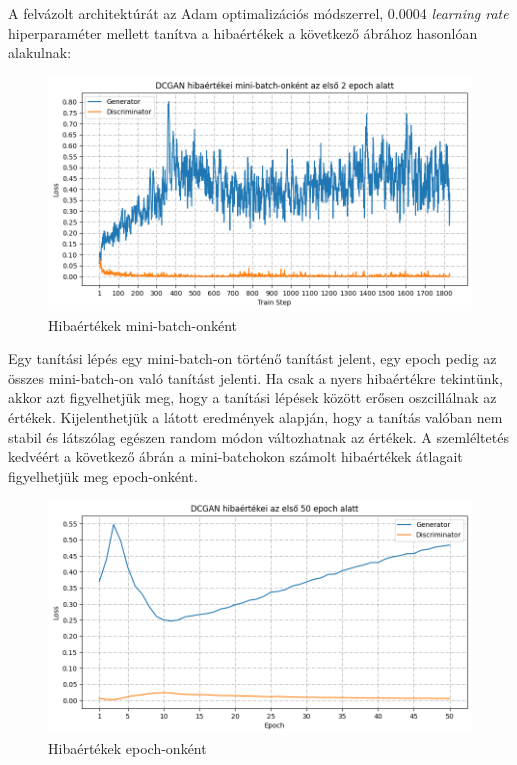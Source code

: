 
A felvázolt architektúrát az Adam optimalizációs módszerrel, 0.0004 \textit{learning rate} hiperparaméter mellett tanítva a hibaértékek a következő ábrához hasonlóan alakulnak:

\begin{figure}[h]
\centering
\includegraphics[width=15cm]{images/miniloss.png}
\caption{Hibaértékek mini-batch-onként}
\label{fig:mini-batch_loss_plot}
\end{figure}

Egy tanítási lépés egy mini-batch-on történő tanítást jelent, egy epoch pedig az összes mini-batch-on való tanítást jelenti.
Ha csak a nyers hibaértékre tekintünk, akkor azt figyelhetjük meg, hogy a tanítási lépések között erősen oszcillálnak az értékek. Kijelenthetjük a látott eredmények alapján, hogy a tanítás valóban nem stabil és látszólag egészen random módon változhatnak az értékek.
A szemléltetés kedvéért a következő ábrán a mini-batchokon számolt hibaértékek átlagait figyelhetjük meg epoch-onként.

\begin{figure}[h]
\centering
\includegraphics[width=15cm]{images/epochloss.png}
\caption{Hibaértékek epoch-onként}
\label{fig:epoch_loss_plot}
\end{figure}


